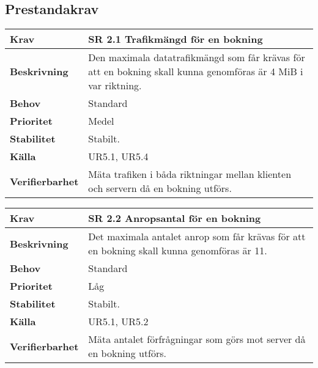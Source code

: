 \documentclass[a4paper, twoside, 11pt, titlepage]{article}
\begin{document}
	\subsection{Prestandakrav}


	\begin {table} [ht] \begin{tabular} { p{2.6cm} p{12.5cm} }
		\hline
		\sffamily\textbf{Krav} & \sffamily\textbf{SR 2.1 Trafikmängd för en bokning } \\
		\hline
		\sffamily\textbf{Beskrivning} & Den maximala datatrafikmängd som får krävas för att en bokning skall kunna genomföras är 4 MiB i var riktning.  \\
		\hline
		\sffamily\textbf{Behov} & Standard  \\
		\hline
		\sffamily\textbf{Prioritet} & Medel  \\
		\hline
		\sffamily\textbf{Stabilitet} & Stabilt.  \\
		\hline
		\sffamily\textbf{Källa} & UR5.1, UR5.4  \\
		\hline
		\sffamily\textbf{Verifierbarhet} & Mäta trafiken i båda riktningar mellan klienten och servern då en bokning utförs.  \\
		\hline
	\end{tabular} \end{table} \FloatBarrier
	\vspace{6mm}

	\begin {table} [ht] \begin{tabular} { p{2.6cm} p{12.5cm} }
		\hline
		\sffamily\textbf{Krav} & \sffamily\textbf{SR 2.2 Anropsantal för en bokning } \\
		\hline
		\sffamily\textbf{Beskrivning} & Det maximala antalet anrop som får krävas för att en bokning skall kunna genomföras är 11.  \\
		\hline
		\sffamily\textbf{Behov} & Standard  \\
		\hline
		\sffamily\textbf{Prioritet} & Låg  \\
		\hline
		\sffamily\textbf{Stabilitet} & Stabilt.  \\
		\hline
		\sffamily\textbf{Källa} & UR5.1, UR5.2  \\
		\hline
		\sffamily\textbf{Verifierbarhet} & Mäta antalet förfrågningar som görs mot server då en bokning utförs.  \\
		\hline
	\end{tabular} \end{table} \FloatBarrier
	\vspace{6mm}
\end{document}
